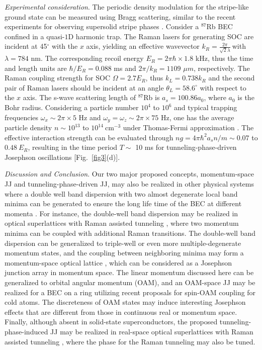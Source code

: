\documentclass[twocolumn,prl,floatfix,citeautoscript,nofootinbib,superscriptaddress]{revtex4}
\begin{document}
{\color{blue}\emph{Experimental consideration}}. The periodic density
modulation for the stripe-like ground state can be measured using Bragg
scattering, similar to the recent experiments for observing supersolid
stripe phases \cite{JunRuLi2017}. Consider a ${}^{87}$Rb BEC confined in a
quasi-$1$D harmonic trap. The Raman lasers for generating SOC are incident
at 45$^{\circ }$ with the $x$ axis, yielding an effective wavevector $k_{R}=%
\frac{2\pi }{\sqrt{2}\lambda }\ $with $\lambda =784$ nm. The corresponding
recoil energy $E_{R}=2\pi \hbar \times 1.8$ kHz, thus the time and length
units are $\hbar /E_{R}=0.088$ ms and $2\pi /k_{R}=1109$ $\mu m$,
respectively. The Raman coupling strength for SOC $\Omega =2.7E_{R}$, thus $%
k_{L}=0.738k_{R}$ and the second pair of Raman lasers should be incident at
an angle $\theta _{L}=58.6^{\circ }$ with respect to the $x$ axis. The
s-wave scattering length of ${}^{87}$Rb is $a_{s}=100.86a_{0}$, where $a_{0}$
is the Bohr radius. Considering a particle number $10^{4}$ to $10^{6}$ and
typical trapping frequencies $\omega _{x}\sim 2\pi \times 5$ Hz and $\omega
_{y}=\omega _{z}\sim 2\pi \times 75$ Hz, one has the average particle
density $n\sim 10^{13}$ to $10^{14}~\text{cm}^{-3}$ under Thomas-Fermi
approximation \cite{BEC-book}. The effective interaction strength can be
evaluated through $ng=4\pi \hbar ^{2}a_{s}n/m\sim 0.07$ to $0.48~E_{R}$,
resulting in the time period $T\sim $ 10 ms for tunneling-phase-driven
Josephson oscillations [Fig.~\ref{fig3}(d)].

{\color{blue}\emph{Discussion and Conclusion}}. Our two major proposed
concepts, momentum-space JJ and tunneling-phase-driven JJ, may also be
realized in other physical systems where a double well band dispersion with
two almost degenerate local band minima can be generated to ensure the long
life time of the BEC at different momenta \cite{An2017}. For instance, the
double-well band dispersion may be realized in optical superlattices with
Raman assisted tunneling \cite{Li2016}, where two momentum minima can be
coupled with additional Raman transitions. The double-well band dispersion
can be generalized to triple-well or even more multiple-degenerate momentum
states, and the coupling between neighboring minima may form a
momentum-space optical lattice \cite{An2017}, which can be considered as a
Josephson junction array \cite{Cataliotti2001} in momentum space. The linear
momentum discussed here can be generalized to orbital angular momentum
(OAM), and an OAM-space JJ may be realized for a BEC on a ring utilizing
recent proposals for spin-OAM coupling \cite{Sun2015, DeMarco2015, Qu2015}
for cold atoms. The discreteness of OAM states may induce interesting
Josephson effects that are different from those in continuous real or
momentum space. Finally, although absent in solid-state superconductors, the
proposed tunneling-phase-induced JJ may be realized in real-space optical
superlattices with Raman assisted tunneling \cite{Li2016}, where the phase
for the Raman tunneling may also be tuned.
\end{document}
